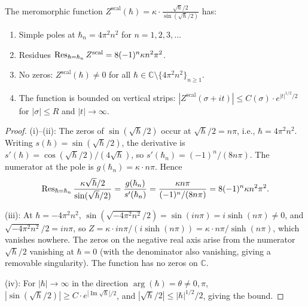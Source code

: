 \begin{proposition}
\label{prop:thqg-I-pole-structure}
The meromorphic function $Z^{\mathrm{scal}}(\hbar) = \kappa \cdot \frac{\sqrt{\hbar}/2}{\sin(\sqrt{\hbar}/2)}$ has:
\begin{enumerate}[label=\textup{(\roman*)}]
\item Simple poles at $\hbar_n = 4\pi^2 n^2$ for $n = 1, 2, 3, \ldots$
\item Residues $\operatorname{Res}_{\hbar = \hbar_n} Z^{\mathrm{scal}} = 8(-1)^n \kappa n^2\pi^2$.
\item No zeros: $Z^{\mathrm{scal}}(\hbar) \neq 0$ for all $\hbar \in \mathbb{C} \setminus \{4\pi^2 n^2\}_{n \geq 1}$.
\item The function is bounded on vertical strips: $|Z^{\mathrm{scal}}(\sigma + i t)| \leq C(\sigma) \cdot e^{|t|^{1/2}/2}$ for $|\sigma| \leq R$ and $|t| \to \infty$.
\end{enumerate}
\end{proposition}

\begin{proof}
(i)--(ii): The zeros of $\sin(\sqrt{\hbar}/2)$ occur at $\sqrt{\hbar}/2 = n\pi$, i.e., $\hbar = 4\pi^2 n^2$. Writing $s(\hbar) = \sin(\sqrt{\hbar}/2)$, the derivative is $s'(\hbar) = \cos(\sqrt{\hbar}/2)/(4\sqrt{\hbar})$, so $s'(\hbar_n) = (-1)^n/(8n\pi)$. The numerator at the pole is $g(\hbar_n) = \kappa \cdot n\pi$. Hence
\[
\operatorname{Res}_{\hbar = \hbar_n} \frac{\kappa\sqrt{\hbar}/2}{\sin(\sqrt{\hbar}/2)}
= \frac{g(\hbar_n)}{s'(\hbar_n)}
= \frac{\kappa n\pi}{(-1)^n/(8n\pi)}
= 8(-1)^n \kappa n^2\pi^2.
\]

(iii): At $\hbar = -4\pi^2 n^2$, $\sin(\sqrt{-4\pi^2 n^2}/2) = \sin(i n\pi) = i\sinh(n\pi) \neq 0$, and $\sqrt{-4\pi^2 n^2}/2 = i n\pi$, so $Z = \kappa \cdot in\pi / (i\sinh(n\pi)) = \kappa \cdot n\pi/\sinh(n\pi)$, which vanishes nowhere. The zeros on the negative real axis arise from the numerator $\sqrt{\hbar}/2$ vanishing at $\hbar = 0$ (with the denominator also vanishing, giving a removable singularity). The function has no zeros on $\mathbb{C}$.

(iv): For $|\hbar| \to \infty$ in the direction $\arg(\hbar) = \theta \neq 0, \pi$, $|\sin(\sqrt{\hbar}/2)| \geq C \cdot e^{|\operatorname{Im}\sqrt{\hbar}|/2}$, and $|\sqrt{\hbar}/2| \leq |\hbar|^{1/2}/2$, giving the bound.
\end{proof}

